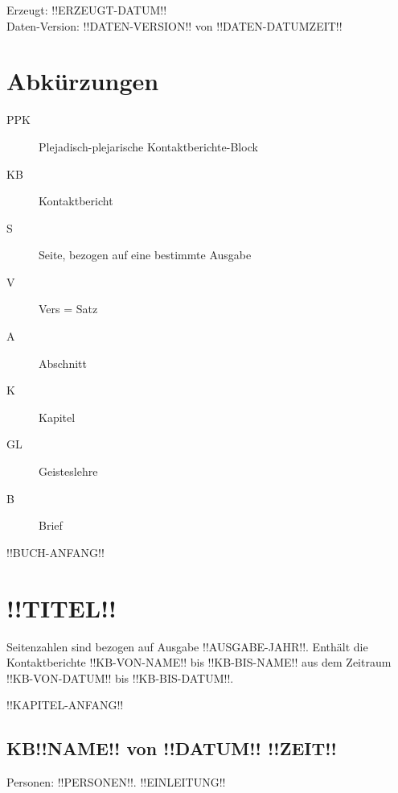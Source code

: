 \documentclass[ngerman,10pt]{book}
\begin{document}
\vspace{2mm}

\noindent Erzeugt: !!ERZEUGT-DATUM!! \\
Daten-Version: !!DATEN-VERSION!! von !!DATEN-DATUMZEIT!!

\newpage



\chapter*{Abkürzungen}

\begin{description}
\item[PPK] Plejadisch-plejarische Kontaktberichte-Block
\item[KB] Kontaktbericht
\item[S] Seite, bezogen auf eine bestimmte Ausgabe
\item[V] Vers = Satz
\item[A] Abschnitt
\item[K] Kapitel
\item[GL] Geisteslehre
\item[B] Brief
\end{description}



\tableofcontents



\mainmatter

!!BUCH-ANFANG!!
\chapter{!!TITEL!!}

Seitenzahlen sind bezogen auf Ausgabe !!AUSGABE-JAHR!!. Enthält die Kontaktberichte !!KB-VON-NAME!! bis !!KB-BIS-NAME!! aus dem Zeitraum !!KB-VON-DATUM!! bis !!KB-BIS-DATUM!!.



!!KAPITEL-ANFANG!!
\section{KB!!NAME!! von !!DATUM!! !!ZEIT!!}

Personen: !!PERSONEN!!. !!EINLEITUNG!!
\end{document}
